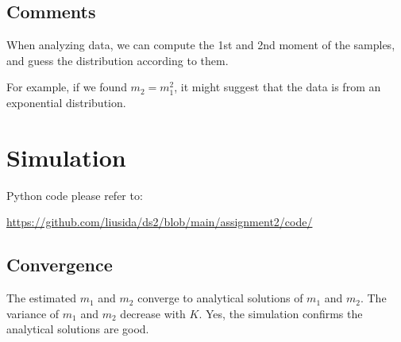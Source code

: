 \subsection*{Comments}
When analyzing data, we can compute the 1st and 2nd moment of the samples, and guess the distribution according to them.

For example, if we found $m_2 = m_1^2$, it might suggest that the data is from an exponential distribution.

\section{Simulation}
Python code please refer to:

\href{https://github.com/liusida/ds2/blob/main/assignment2/code/}{https://github.com/liusida/ds2/blob/main/assignment2/code/}



\subsection*{Convergence}
The estimated $m_1$ and $m_2$ converge to analytical solutions of $m_1$ and $m_2$.
The variance of $m_1$ and $m_2$ decrease with $K$.
Yes, the simulation confirms the analytical solutions are good.


